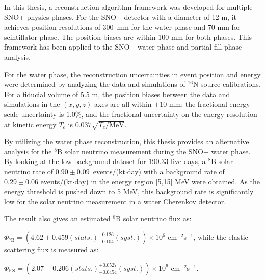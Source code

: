 In this thesis, a reconstruction algorithm framework was developed for multiple SNO+ physics phases. For the SNO+ detector with a diameter of 12 m, it achieves position resolutions of 300~mm for the water phase and 70 mm for scintillator phase. The position biases are within 100 mm for both phases. This framework has been applied to the SNO+ water phase and partial-fill phase analysis. 

For the water phase, the reconstruction uncertainties in event position and energy were determined by analyzing the data and simulations of $^{16}$N source calibrations. For a fiducial volume of 5.5 m, the position biases between the data and simulations in the $(x,y,z)$ axes are all within $\pm10$ mm; the fractional energy scale uncertainty is $1.0$\%, and the fractional uncertainty on the energy resolution at kinetic energy $T_e$ is $0.037\sqrt{T_e/\mathrm{MeV}}$.

By utilizing the water phase reconstruction, this thesis provides an alternative analysis for the $^8$B solar neutrino measurement during the SNO+ water phase. By looking at the low background dataset for 190.33 live days, a $^8$B solar neutrino rate of $0.90\pm0.09$~events/(kt$\cdot$day) with a background rate of $0.29\pm 0.06$ events/(kt$\cdot$day) in the energy region [5,15] MeV were obtained. As the energy threshold is pushed down to 5 MeV, this background rate is significantly low for the solar neutrino measurement in a water Cherenkov detector.

The result also gives an estimated $^8$B solar neutrino flux as: 

$\Phi_{\mathrm{^8B}}=(4.62 \pm 0.459 (stats.)^{+0.126}_{-0.104}(syst.))\times10^6$ cm$^{-2}$s$^{-1}$, 
while the elastic scattering flux is measured as: 

$\Phi_{\mathrm{ES}}=(2.07 \pm 0.206(stats.)^{+0.0527}_{-0.0454}(syst.))\times10^6$ cm$^{-2}$s$^{-1}$.
